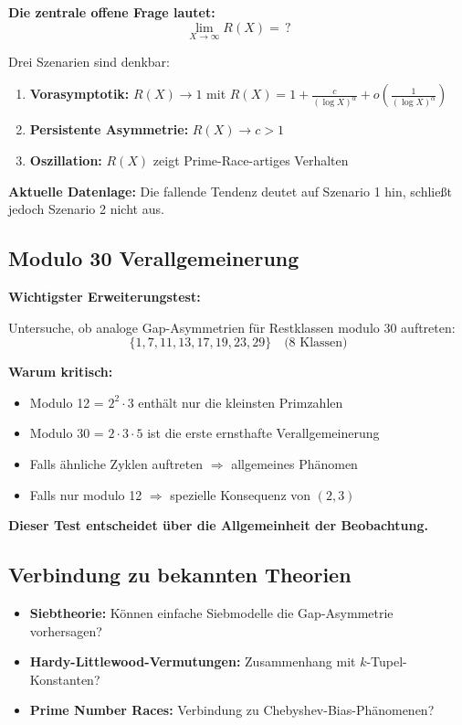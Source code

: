 \documentclass[11pt,a4paper]{article}
\begin{document}
\textbf{Die zentrale offene Frage lautet:}
\[
\lim_{X \to \infty} R(X) = \, ?
\]

Drei Szenarien sind denkbar:

\begin{enumerate}
\item \textbf{Vorasymptotik:} $R(X) \to 1$ mit $R(X) = 1 + \frac{c}{(\log X)^\alpha} + o\left(\frac{1}{(\log X)^\alpha}\right)$
\item \textbf{Persistente Asymmetrie:} $R(X) \to c > 1$
\item \textbf{Oszillation:} $R(X)$ zeigt Prime-Race-artiges Verhalten
\end{enumerate}

\textbf{Aktuelle Datenlage:} Die fallende Tendenz deutet auf Szenario 1 hin, schließt jedoch Szenario 2 nicht aus.

\subsection{Modulo 30 Verallgemeinerung}

\textbf{Wichtigster Erweiterungstest:}

Untersuche, ob analoge Gap-Asymmetrien für Restklassen modulo 30 auftreten:
\[
\{1, 7, 11, 13, 17, 19, 23, 29\} \quad \text{(8 Klassen)}
\]

\textbf{Warum kritisch:}
\begin{itemize}
\item Modulo 12 = $2^2 \cdot 3$ enthält nur die kleinsten Primzahlen
\item Modulo 30 = $2 \cdot 3 \cdot 5$ ist die erste ernsthafte Verallgemeinerung
\item Falls ähnliche Zyklen auftreten $\Rightarrow$ allgemeines Phänomen
\item Falls nur modulo 12 $\Rightarrow$ spezielle Konsequenz von $(2, 3)$
\end{itemize}

\textbf{Dieser Test entscheidet über die Allgemeinheit der Beobachtung.}

\subsection{Verbindung zu bekannten Theorien}

\begin{itemize}
\item \textbf{Siebtheorie:} Können einfache Siebmodelle die Gap-Asymmetrie vorhersagen?
\item \textbf{Hardy-Littlewood-Vermutungen:} Zusammenhang mit $k$-Tupel-Konstanten?
\item \textbf{Prime Number Races:} Verbindung zu Chebyshev-Bias-Phänomenen?
\end{itemize}
\end{document}
